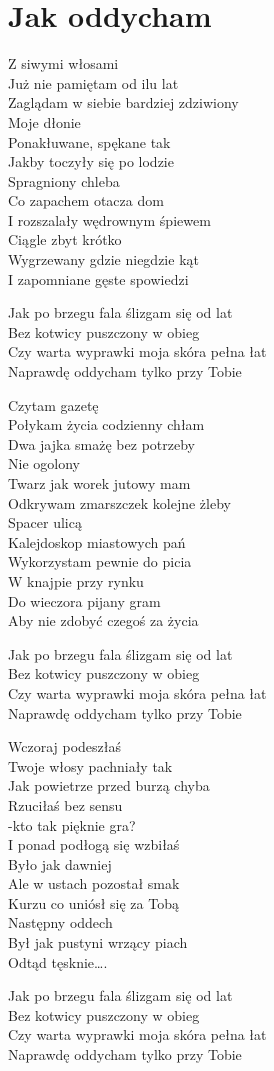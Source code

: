 \section{Jak oddycham}
\begin{text}
Z siwymi włosami\\
Już nie pamiętam od ilu lat\\
Zaglądam w siebie bardziej zdziwiony\\
Moje dłonie\\
Ponakłuwane, spękane tak\\
Jakby toczyły się po lodzie\\
Spragniony chleba\\
Co zapachem otacza dom\\
I rozszalały wędrownym śpiewem\\
Ciągle zbyt krótko\\
Wygrzewany gdzie niegdzie kąt\\
I zapomniane gęste spowiedzi

Jak po brzegu fala ślizgam się od lat\\
Bez kotwicy puszczony w obieg\\
Czy warta wyprawki moja skóra pełna łat\\
Naprawdę oddycham tylko przy Tobie

Czytam gazetę\\
Połykam życia codzienny chłam\\
Dwa jajka smażę bez potrzeby\\
Nie ogolony\\
Twarz jak worek jutowy mam\\
Odkrywam zmarszczek kolejne żleby\\
Spacer ulicą\\
Kalejdoskop miastowych pań\\
Wykorzystam pewnie do picia\\
W knajpie przy rynku\\
Do wieczora pijany gram\\
Aby nie zdobyć czegoś za życia

Jak po brzegu fala ślizgam się od lat\\
Bez kotwicy puszczony w obieg\\
Czy warta wyprawki moja skóra pełna łat\\
Naprawdę oddycham tylko przy Tobie

Wczoraj podeszłaś\\
Twoje włosy pachniały tak\\
Jak powietrze przed burzą chyba\\
Rzuciłaś bez sensu\\
-kto tak pięknie gra?\\
I ponad podłogą się wzbiłaś\\
Było jak dawniej\\
Ale w ustach pozostał smak\\
Kurzu co uniósł się za Tobą\\
Następny oddech\\
Był jak pustyni wrzący piach\\
Odtąd tęsknie….

Jak po brzegu fala ślizgam się od lat\\
Bez kotwicy puszczony w obieg\\
Czy warta wyprawki moja skóra pełna łat\\
Naprawdę oddycham tylko przy Tobie
\end{text}